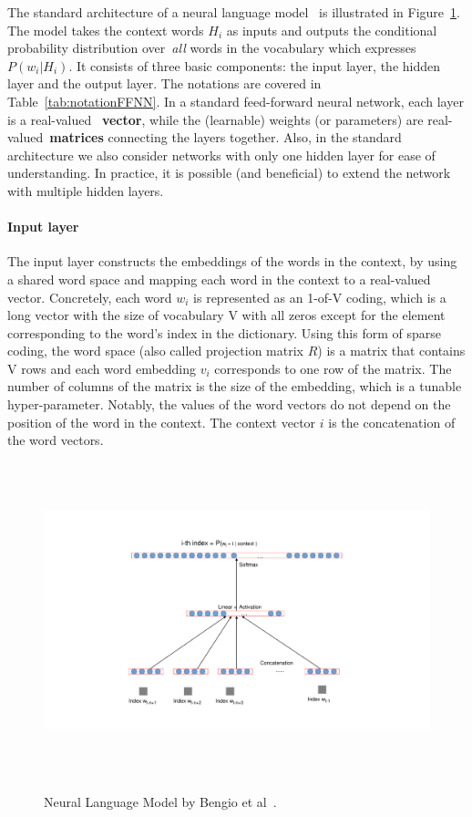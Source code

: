 The standard architecture of a neural language model~\cite{bengio2003neural} is illustrated in Figure~\ref{fig:neuralBengio}. The model takes the context words $H_i$ as inputs and outputs the conditional probability distribution over~\textit{all} words in the vocabulary which expresses $P(w_i|H_i)$. It consists of three basic components: the input layer, the hidden layer and the output layer. The notations are covered in Table~\ref{tab:notationFFNN}. In a standard feed-forward neural network, each layer is a real-valued ~\textbf{vector}, while the (learnable) weights (or parameters) are real-valued~\textbf{matrices} connecting the layers together. Also, in the standard architecture we also consider networks with only one hidden layer for ease of understanding. In practice, it is possible (and beneficial) to extend the network with multiple hidden layers.


\paragraph{Input layer}
The input layer constructs the embeddings of the words in the context, by using a shared word space and mapping each word in the context to a real-valued vector. Concretely, each word $w_i$ is represented as an 1-of-V coding, which is a long vector with the size of vocabulary V with all zeros except for the element corresponding to the word's index in the dictionary. Using this form of sparse coding, the word space (also called projection matrix $R$) is a matrix that contains V rows and each word embedding $v_i$ corresponds to one row of the matrix. The number of columns of the matrix is the size of the embedding, which is a tunable hyper-parameter. Notably, the values of the word vectors do not depend on the position of the word in the context. The context vector $i$ is the concatenation of the word vectors.

~ \begin{figure}[!t]
	~ \centering
	~ \includegraphics[width=\columnwidth]{figures/neuralLM.pdf}
	~ \caption{Neural Language Model by Bengio et al~\cite{bengio2003neural}.}  
	~ \label{fig:neuralBengio}
	~ \end{figure}

